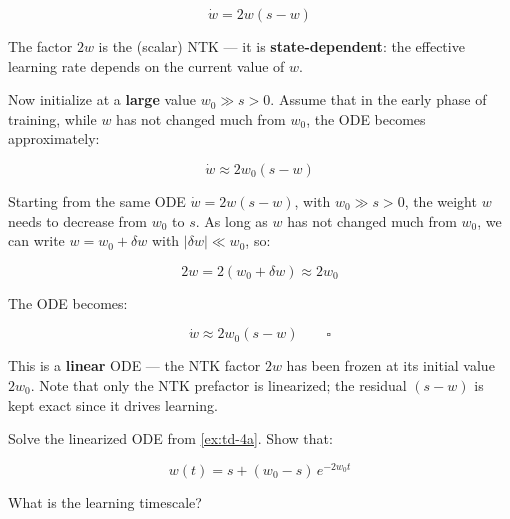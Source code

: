 \documentclass[11pt]{article}
\begin{document}
\[\dot{w} = 2w(s - w)\]

The factor \(2w\) is the (scalar) NTK --- it is
\textbf{state-dependent}: the effective learning rate depends on the
current value of \(w\).

\begin{exercise}
\label{ex:td-4a}
Now initialize at a \textbf{large} value \(w_0 \gg s > 0\). Assume that in
the early phase of training, while \(w\) has not changed much from
\(w_0\), the ODE becomes approximately:

\[\dot{w} \approx 2w_0(s - w)\]
\end{exercise}

\begin{solution}[ex:td-4a]
Starting from the same ODE \(\dot{w} = 2w(s - w)\), with
\(w_0 \gg s > 0\), the weight \(w\) needs to decrease from \(w_0\) to
\(s\). As long as \(w\) has not changed much from \(w_0\), we can write
\(w = w_0 + \delta w\) with \(|\delta w| \ll w_0\), so:

\[2w = 2(w_0 + \delta w) \approx 2w_0\]

The ODE becomes:

\[\dot{w} \approx 2w_0(s - w) \qquad \square\]

This is a \textbf{linear} ODE --- the NTK factor \(2w\) has been frozen
at its initial value \(2w_0\). Note that only the NTK prefactor is
linearized; the residual \((s - w)\) is kept exact since it drives
learning.
\end{solution}

\begin{exercise}
\label{ex:td-4b}
Solve the linearized ODE from \cref{ex:td-4a}. Show that:

\[w(t) = s + (w_0 - s)\,e^{-2w_0 t}\]

What is the learning timescale?
\end{exercise}
\end{document}
